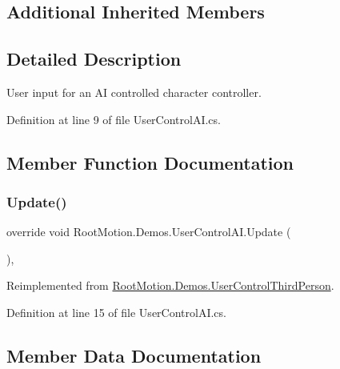 \subsection*{Additional Inherited Members}


\subsection{Detailed Description}
User input for an AI controlled character controller. 



Definition at line 9 of file User\+Control\+A\+I.\+cs.



\subsection{Member Function Documentation}
\mbox{\label{class_root_motion_1_1_demos_1_1_user_control_a_i_ab0d7ff405d38dd90d40941fd3d071762}} 
\subsubsection{\texorpdfstring{Update()}{Update()}}
{\footnotesize\ttfamily override void Root\+Motion.\+Demos.\+User\+Control\+A\+I.\+Update (\begin{DoxyParamCaption}{ }\end{DoxyParamCaption})\hspace{0.3cm}{\ttfamily [protected]}, {\ttfamily [virtual]}}



Reimplemented from \mbox{\hyperlink{class_root_motion_1_1_demos_1_1_user_control_third_person_ac429f5624f918df39ba614e1f6a73ddc}{Root\+Motion.\+Demos.\+User\+Control\+Third\+Person}}.



Definition at line 15 of file User\+Control\+A\+I.\+cs.



\subsection{Member Data Documentation}
\mbox{\label{class_root_motion_1_1_demos_1_1_user_control_a_i_a84735d68086c8534588cdae1052ddb9f}} 

